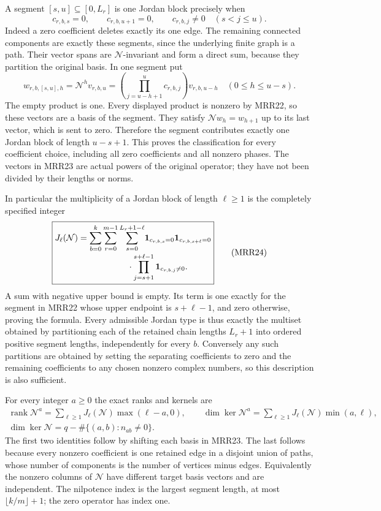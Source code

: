 A segment $[s,u]\subseteq[0,L_r]$ is one Jordan block
precisely when
\[
c_{r,b,s}=0,\qquad c_{r,b,u+1}=0,\qquad
c_{r,b,j}\ne0\quad(s<j\le u).
\tag{MRR22}
\]
Indeed a zero coefficient deletes exactly its one edge.
The remaining connected components are exactly these
segments, since the underlying finite graph is a path.
Their vector spans are $\mathcal N$-invariant and form
a direct sum, because they partition the original basis.
In one segment put
\[
w_{r,b,[s,u],h}=\mathcal N^h v_{r,b,u}
=\left(\prod_{j=u-h+1}^{u}c_{r,b,j}\right)v_{r,b,u-h}
\quad(0\le h\le u-s).
\tag{MRR23}
\]
The empty product is one. Every displayed product is nonzero
by MRR22, so these vectors are a basis of the segment.
They satisfy $\mathcal Nw_h=w_{h+1}$ up to its last vector,
which is sent to zero. Therefore the segment contributes
exactly one Jordan block of length $u-s+1$.
This proves the classification for every coefficient choice,
including all zero coefficients and all nonzero phases.
The vectors in MRR23 are actual powers of the original
operator; they have not been divided by their lengths or norms.

In particular the multiplicity of a Jordan block of length
$\ell\ge1$ is the completely specified integer
\[
\boxed{
\begin{aligned}
J_\ell(\mathcal N)
=\sum_{b=0}^k\sum_{r=0}^{m-1}
\sum_{s=0}^{L_r+1-\ell}
 &\mathbf1_{c_{r,b,s}=0}
  \mathbf1_{c_{r,b,s+\ell}=0}\\[-2pt]
 &\hspace{-20pt}\cdot
 \prod_{j=s+1}^{s+\ell-1}\mathbf1_{c_{r,b,j}\ne0}.
\end{aligned}}
\tag{MRR24}
\]
A sum with negative upper bound is empty.
Its term is one exactly for the segment in MRR22 whose
upper endpoint is $s+\ell-1$, and zero otherwise, proving
the formula. Every admissible Jordan type is thus exactly
the multiset obtained by partitioning each of the retained
chain lengths $L_r+1$ into ordered positive segment lengths,
independently for every $b$. Conversely any such partitions
are obtained by setting the separating coefficients to zero
and the remaining coefficients to any chosen nonzero complex
numbers, so this description is also sufficient.

For every integer $a\ge0$ the exact ranks and kernels are
\[
\begin{gathered}
\operatorname{rank}\mathcal N^a
=\sum_{\ell\ge1}J_\ell(\mathcal N)\max(\ell-a,0),\qquad
\dim\ker\mathcal N^a
=\sum_{\ell\ge1}J_\ell(\mathcal N)\min(a,\ell),\\
\dim\ker\mathcal N
=q-\#\{(a,b):n_{ab}\ne0\}.
\end{gathered}
\tag{MRR25}
\]
The first two identities follow by shifting each basis in
MRR23. The last follows because every nonzero coefficient
is one retained edge in a disjoint union of paths, whose
number of components is the number of vertices minus edges.
Equivalently the nonzero columns of $\mathcal N$ have
different target basis vectors and are independent.
The nilpotence index is the largest segment length, at most
$\lfloor k/m\rfloor+1$; the zero operator has index one.

